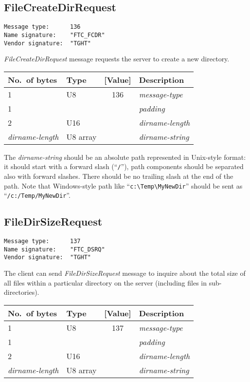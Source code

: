 \documentclass[a4paper]{article}
\newcommand{\typestr}[1]{\textit{#1}}
\begin{document}

\newpage
\subsection{FileCreateDirRequest}
\begin{verbatim}
Message type:      136
Name signature:    "FTC_FCDR"
Vendor signature:  "TGHT"
\end{verbatim}

\typestr{FileCreateDirRequest} message requests the server to create a
new directory.

\begin{tabular}{l|lc|l} \hline
No.\ of bytes & Type & [Value] & Description \\ \hline
1 & U8  & 136 & \typestr{message-type} \\
1 &     &     & \typestr{padding} \\
2 & U16 &     & \typestr{dirname-length} \\
\typestr{dirname-length} & U8 array & & \typestr{dirname-string} \\
\hline\end{tabular}

The \typestr{dirname-string} should be an absolute path represented in
Unix-style format: it should start with a forward slash
(``\verb|/|''), path components should be separated also with forward
slashes. There should be no trailing slash at the end of the path.
Note that Windows-style path like
``\verb|c:\Temp\MyNewDir|'' should be sent as
``\verb|/c:/Temp/MyNewDir|''.


\newpage
\subsection{FileDirSizeRequest}
\begin{verbatim}
Message type:      137
Name signature:    "FTC_DSRQ"
Vendor signature:  "TGHT"
\end{verbatim}

The client can send \typestr{FileDirSizeRequest} message to inquire
about the total size of all files within a particular directory on the
server (including files in sub-directories).

\begin{tabular}{l|lc|l} \hline
No.\ of bytes & Type & [Value] & Description \\ \hline
1 & U8  & 137 & \typestr{message-type} \\
1 &     &     & \typestr{padding} \\
2 & U16 &     & \typestr{dirname-length} \\
\typestr{dirname-length} & U8 array & & \typestr{dirname-string} \\
\hline\end{tabular}
\end{document}
